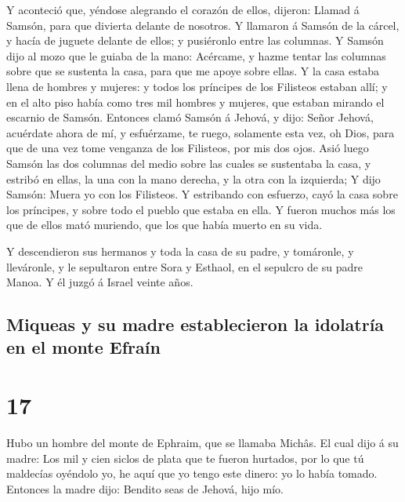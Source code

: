  Y aconteció que, yéndose alegrando el corazón de ellos,
dijeron: Llamad á Samsón, para que divierta delante de nosotros. Y
llamaron á Samsón de la cárcel, y hacía de juguete delante de ellos; y
pusiéronlo entre las columnas.  Y Samsón dijo al mozo que
le guiaba de la mano: Acércame, y hazme tentar las columnas sobre que se
sustenta la casa, para que me apoye sobre ellas.  Y la
casa estaba llena de hombres y mujeres: y todos los príncipes de los
Filisteos estaban allí; y en el alto piso había como tres mil hombres y
mujeres, que estaban mirando el escarnio de Samsón. 
Entonces clamó Samsón á Jehová, y dijo: Señor Jehová, acuérdate ahora de
mí, y esfuérzame, te ruego, solamente esta vez, oh Dios, para que de una
vez tome venganza de los Filisteos, por mis dos ojos. 
Asió luego Samsón las dos columnas del medio sobre las cuales se
sustentaba la casa, y estribó en ellas, la una con la mano derecha, y la
otra con la izquierda;  Y dijo Samsón: Muera yo con los
Filisteos. Y estribando con esfuerzo, cayó la casa sobre los príncipes,
y sobre todo el pueblo que estaba en ella. Y fueron muchos más los que
de ellos mató muriendo, que los que había muerto en su vida.

 Y descendieron sus hermanos y toda la casa de su padre,
y tomáronle, y lleváronle, y le sepultaron entre Sora y Esthaol, en el
sepulcro de su padre Manoa. Y él juzgó á Israel veinte años.

\hypertarget{miqueas-y-su-madre-establecieron-la-idolatruxeda-en-el-monte-efrauxedn}{%
\subsection{Miqueas y su madre establecieron la idolatría en el monte
Efraín}\label{miqueas-y-su-madre-establecieron-la-idolatruxeda-en-el-monte-efrauxedn}}

\hypertarget{section-07-17}{%
\section{17}\label{section-07-17}}

 Hubo un hombre del monte de Ephraim, que se llamaba
Michâs.  El cual dijo á su madre: Los mil y cien siclos de
plata que te fueron hurtados, por lo que tú maldecías oyéndolo yo, he
aquí que yo tengo este dinero: yo lo había tomado. Entonces la madre
dijo: Bendito seas de Jehová, hijo mío.

